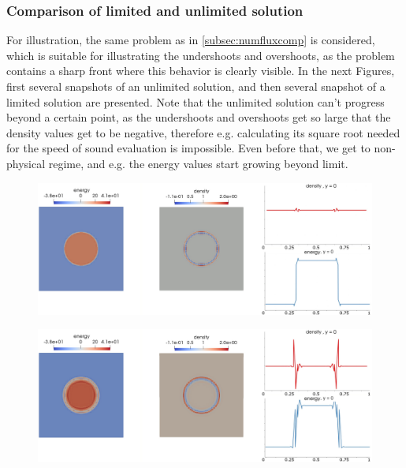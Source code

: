 \subsubsection{Comparison of limited and unlimited solution}
For illustration, the same problem as in \cref{subsec:numfluxcomp} is considered, which is suitable for illustrating the undershoots and overshoots, as the problem contains a sharp front where this behavior is clearly visible.
In the next Figures, first several snapshots of an unlimited solution, and then several snapshot of a limited solution are presented. Note that the unlimited solution can't progress beyond a certain point, as the undershoots and overshoots get so large that the density values get to be negative, therefore e.g. calculating its square root needed for the speed of sound evaluation is impossible. Even before that, we get to non-physical regime, and e.g. the energy values start growing beyond limit.
\begin{figure}[H]
		\begin{center}
			\includegraphics[width=\textwidth]{img/limit/nl1.jpg}
		\end{center}
	\end{figure}\vspace{-8mm}
	\begin{figure}[H]
		\begin{center}
			\includegraphics[width=\textwidth]{img/limit/nl3.jpg}
		\end{center}
	\end{figure}\vspace{-8mm}
